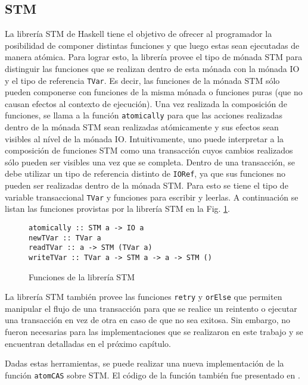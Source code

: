 \subsection{STM}\label{sub:stm}
La librería STM de Haskell tiene el objetivo de ofrecer al programador la posibilidad de componer distintas funciones y que luego estas sean ejecutadas de manera atómica.
Para lograr esto, la librería provee el tipo de mónada STM para distinguir las funciones que se realizan dentro de esta mónada con la mónada IO y el tipo de referencia \texttt{TVar}.
Es decir, las funciones de la mónada STM sólo pueden componerse con funciones de la misma mónada o funciones puras (que no causan efectos al contexto de ejecución). Una vez realizada la composición de funciones, se llama a la función \texttt{atomically} para que las acciones realizadas dentro de la mónada STM sean realizadas atómicamente y sus efectos sean visibles al nível de la mónada IO.
Intuitivamente, uno puede interpretar a la composición de funciones STM como una transacción cuyos cambios realizados sólo pueden ser visibles una vez que se completa.
Dentro de una transacción, se debe utilizar un tipo de referencia distinto de \texttt{IORef}, ya que sus funciones no pueden ser realizadas dentro de la mónada STM. Para esto se tiene el tipo de variable transaccional \texttt{TVar} y funciones para escribir y leerlas.
A continuación se listan las funciones provistas por la librería STM en la Fig. \ref{fig:stm-interface}.

\begin{figure}[H]
\begin{verbatim}
atomically :: STM a -> IO a
newTVar :: TVar a
readTVar :: a -> STM (TVar a)
writeTVar :: TVar a -> STM a -> a -> STM ()
\end{verbatim}
\caption{Funciones de la librería STM}
\label{fig:stm-interface}
\end{figure}

La librería STM también provee las funciones \texttt{retry} y \texttt{orElse} que permiten manipular el flujo de una transacción para que se realice un reintento o ejecutar una transacción en vez de otra en caso de que no sea exitosa.
Sin embargo, no fueron necesarias para las implementaciones que se realizaron en este trabajo y se encuentran detalladas en el próximo capítulo.

Dadas estas herramientas, se puede realizar una nueva implementación de la función \texttt{atomCAS} sobre STM.
El código de la función también fue presentado en \cite{linked-list}.

